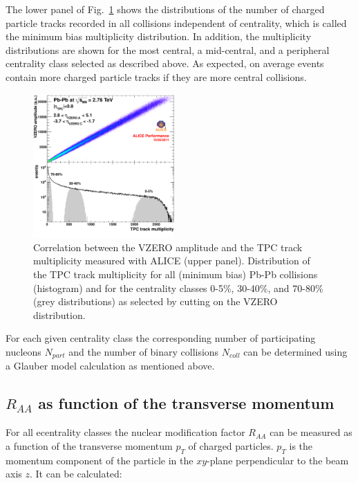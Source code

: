 \documentclass{article}
\begin{document}
The lower panel of Fig.~\ref{fig:Centrality} shows the distributions of
the number of charged particle tracks recorded in all collisions independent
of centrality, which is called the minimum bias multiplicity distribution.
In addition, the multiplicity distributions are shown for the most central,
a mid-central, and a peripheral centrality class selected as described above.
As expected, on average events contain more charged particle tracks if they
are more central collisions.

\begin{figure}[t]
	\centering
   \includegraphics[width=0.48\textwidth]{2011-May-22-tpcv0_combined3only.pdf}
	\caption{Correlation between the VZERO amplitude and the TPC track 
                 multiplicity measured with ALICE (upper panel). Distribution 
                 of the TPC track multiplicity for all (minimum bias) Pb-Pb
                 collisions (histogram) and for the centrality classes 0-5\%,
                 30-40\%, and 70-80\% (grey distributions) as selected by
                 cutting on the VZERO distribution.}
	\label{fig:Centrality}
\end{figure}

For each given centrality class the corresponding number of participating
nucleons $N_{part}$ and the number of binary collisions $N_{coll}$ can be
determined using a Glauber model calculation as mentioned above.

\subsection{$R_{AA}$ as function of the transverse momentum}
For all ecentrality classes the nuclear modification factor $R_{AA}$ can be 
measured as a function of the transverse momentum $p_T$ of charged particles.
$p_T$ is the momentum component of the particle in the $xy$-plane perpendicular 
to the beam axis $z$. It can be calculated:
\end{document}
